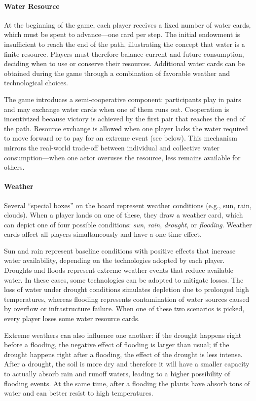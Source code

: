 \documentclass[preprint,12pt]{elsarticle}
\begin{document}
\paragraph{Water Resource}
At the beginning of the game, each player receives a fixed number of water cards, which must be spent to advance—one card per step. The initial endowment is insufficient to reach the end of the path, illustrating the concept that water is a finite resource. Players must therefore balance current and future consumption, deciding when to use or conserve their resources. Additional water cards can be obtained during the game through a combination of favorable weather and technological choices.

The game introduces a semi-cooperative component: participants play in pairs and may exchange water cards when one of them runs out. Cooperation is incentivized because victory is achieved by the first pair that reaches the end of the path. Resource exchange is allowed when one player lacks the water required to move forward or to pay for an extreme event (see below). This mechanism mirrors the real-world trade-off between individual and collective water consumption—when one actor overuses the resource, less remains available for others.

\paragraph{Weather}
Several “special boxes” on the board represent weather conditions (e.g., sun, rain, clouds). When a player lands on one of these, they draw a weather card, which can depict one of four possible conditions: \textit{sun}, \textit{rain}, \textit{drought}, or \textit{flooding}. Weather cards affect all players simultaneously and have a one-time effect. 

Sun and rain represent baseline conditions with positive effects that increase water availability, depending on the technologies adopted by each player. Droughts and floods represent extreme weather events that reduce available water. In these cases, some technologies can be adopted to mitigate losses. The loss of water under drought conditions simulates depletion due to prolonged high temperatures, whereas flooding represents contamination of water sources caused by overflow or infrastructure failure. When one of these two scenarios is picked, every player loses some water resource cards.

Extreme weathers can also influence one another: if the drought happens right before a flooding, the negative effect of flooding is larger than usual; if the drought happens right after a flooding, the effect of the drought is less intense. After a drought, the soil is more dry and therefore it will have a smaller capacity to actually absorb rain and runoff waters, leading to a higher possibility of flooding events. At the same time, after a flooding the plants have absorb tons of water and can better resist to high temperatures.
\end{document}
